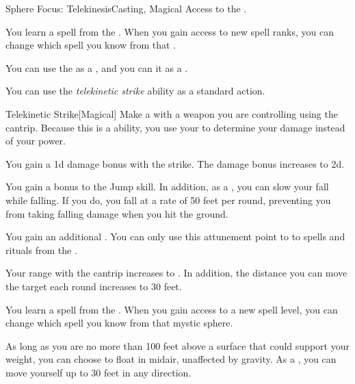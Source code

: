     \begin{feat}{Sphere Focus: Telekinesis}{Casting, Magical}
        \featpre Access to the  .

         You learn a spell from the  .
        When you gain access to new spell ranks, you can change which spell you know from that .

         You can use the   as a , and you can  it as a .

         You can use the \textit{telekinetic strike} ability as a standard action.
        \begin{freeability}{Telekinetic Strike}[Magical]
            Make a  with a weapon you are controlling using the  cantrip.
            Because this is a  ability, you use your   to determine your damage instead of your  power.

            \rankline
             You gain a \plus1d damage bonus with the strike.
             The damage bonus increases to \plus2d.
        \end{freeability}

         You gain a  bonus to the Jump skill.
        In addition, as a , you can slow your fall while falling.
        If you do, you fall at a rate of 50 feet per round, preventing you from taking falling damage when you hit the ground.

         You gain an additional .
        You can only use this attunement point to  to spells and rituals from the  .

         Your range with the  cantrip increases to \rngmed.
        In addition, the distance you can move the target each round increases to 30 feet.

         You learn a spell from the  .
        When you gain access to a new spell level, you can change which spell you know from that mystic sphere.

         As long as you are no more than 100 feet above a surface that could support your weight, you can choose to float in midair, unaffected by gravity.
        As a , you can move yourself up to 30 feet in any direction.
    \end{feat}

